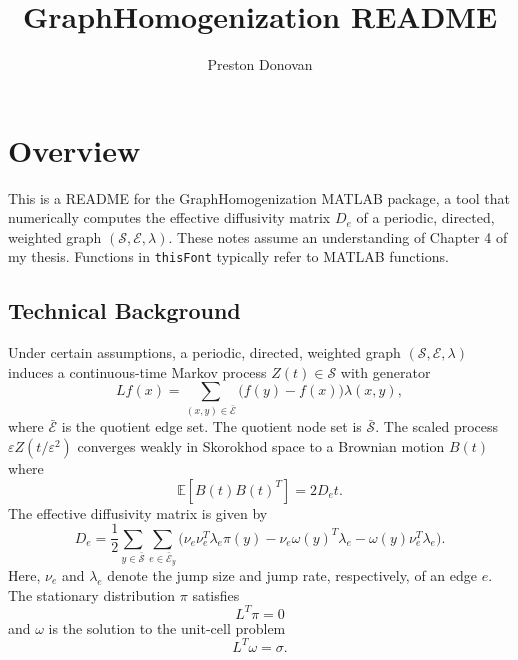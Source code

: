 \documentclass[11pt, oneside]{article}   	%
\title{GraphHomogenization README}
\author{Preston Donovan}
\date{}
\theoremstyle{definition}
\newcommand\sS{\mathcal{S}}
\newcommand\sE{\mathcal{E}}
\newcommand{\eps}{{\varepsilon}}
\newcommand\oS{\bar{\sS}}
\newcommand\oE{\bar{\sE}}
\begin{document}
\maketitle

\tableofcontents

\section{Overview}

This is a README for the GraphHomogenization MATLAB package, a tool that numerically computes the effective diffusivity matrix $D_e$ of a periodic, directed, weighted graph $(\sS,\sE,\lambda)$. These notes assume an understanding of Chapter 4 of my thesis. Functions in \texttt{thisFont} typically refer to MATLAB functions.
   
\subsection{Technical Background}
Under certain assumptions, a periodic, directed, weighted graph $(\sS,\sE,\lambda)$ induces a continuous-time Markov process $Z(t) \in \sS$ with generator
\begin{equation}
Lf(x) = \sum_{(x,y) \in \oE} \big(f(y) - f(x)\big) \lambda(x,y),
\end{equation}
where $\oE$ is the quotient edge set. The quotient node set is $\oS$. The scaled process $\eps Z(t/\eps^2)$ converges weakly in Skorokhod space to a Brownian motion $B(t)$ where
\begin{equation}
\mathbb{E}[B(t) B(t)^T] = 2 D_e t.
\end{equation}
The effective diffusivity matrix is given by
\begin{equation}\label{eqn:Deff}
D_e = \frac{1}{2} \sum_{y\in\oS} \sum_{e \in \oE_y} \Big(\nu_e \nu_e^T  \lambda_e \pi(y) - \nu_e \omega(y)^T\lambda_e - \omega(y)\nu_e^T\lambda_e\Big).
\end{equation}
Here, $\nu_e$ and $\lambda_e$ denote the jump size and jump rate, respectively, of an edge $e$. The stationary distribution $\pi$ satisfies
\begin{equation}\label{eqn:pi}
L^T \pi = 0
\end{equation}
and $\omega$ is the solution to the unit-cell problem
\begin{equation}\label{eqn:unit-cell}
	L^T \omega = \sigma.
\end{equation}
\end{document}
